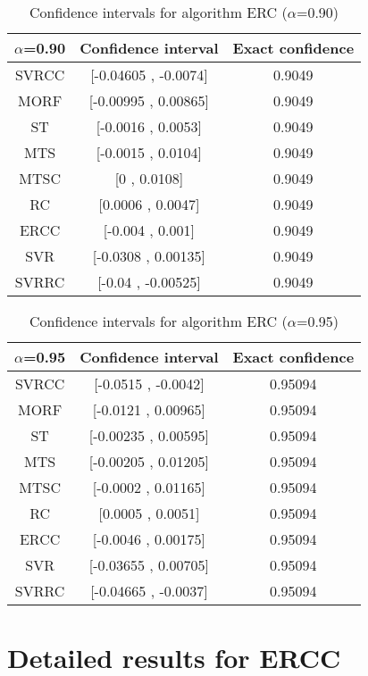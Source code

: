 \documentclass[a4paper,10pt]{article}
\begin{document}
\begin{table}[!htp]
\centering\small
\begin{tabular}{
|c|c|c|}
\hline
 $\alpha$=0.90 & Confidence interval & Exact confidence \\ \hline 
SVRCC & [-0.04605 , -0.0074] & 0.9049\\ \hline 
MORF & [-0.00995 , 0.00865] & 0.9049\\ \hline 
ST & [-0.0016 , 0.0053] & 0.9049\\ \hline 
MTS & [-0.0015 , 0.0104] & 0.9049\\ \hline 
MTSC & [0 , 0.0108] & 0.9049\\ \hline 
RC & [0.0006 , 0.0047] & 0.9049\\ \hline 
ERCC & [-0.004 , 0.001] & 0.9049\\ \hline 
SVR & [-0.0308 , 0.00135] & 0.9049\\ \hline 
SVRRC & [-0.04 , -0.00525] & 0.9049\\ \hline 

\end{tabular}
\caption{Confidence intervals for algorithm ERC ($\alpha$=0.90)}
\end{table}
\begin{table}[!htp]
\centering\small
\begin{tabular}{
|c|c|c|}
\hline
 $\alpha$=0.95 & Confidence interval & Exact confidence \\ \hline 
SVRCC & [-0.0515 , -0.0042] & 0.95094\\ \hline 
MORF & [-0.0121 , 0.00965] & 0.95094\\ \hline 
ST & [-0.00235 , 0.00595] & 0.95094\\ \hline 
MTS & [-0.00205 , 0.01205] & 0.95094\\ \hline 
MTSC & [-0.0002 , 0.01165] & 0.95094\\ \hline 
RC & [0.0005 , 0.0051] & 0.95094\\ \hline 
ERCC & [-0.0046 , 0.00175] & 0.95094\\ \hline 
SVR & [-0.03655 , 0.00705] & 0.95094\\ \hline 
SVRRC & [-0.04665 , -0.0037] & 0.95094\\ \hline 

\end{tabular}
\caption{Confidence intervals for algorithm ERC ($\alpha$=0.95)}
\end{table}

 \clearpage 


\section{Detailed results for ERCC}
\end{document}

